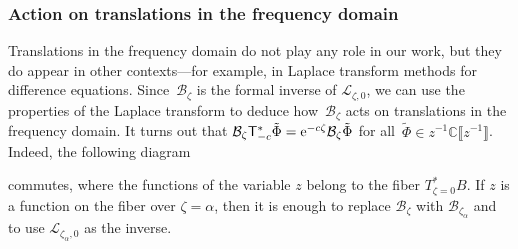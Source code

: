 \documentclass[10pt,a4paper]{amsart}
\newcommand{\C}{\mathbb{C}}
\newcommand{\series}[1]{\tilde{#1}}
\newcommand{\laplace}{\mathcal{L}}
\newcommand{\borel}{\mathcal{B}}
\numberwithin{equation}{section}
\begin{document}
\subsubsection{Action on translations in the frequency domain}
Translations in the frequency domain do not play any role in our work, but they do appear in other contexts---for example, in Laplace transform methods for difference equations. Since~$\borel_\zeta$ is the formal inverse of $\laplace_{\zeta,0}$, we can use the properties of the Laplace transform to deduce how~$\borel_\zeta$ acts on translations in the frequency domain. It turns out that
$\borel_\zeta \mathsf{T}_{-c}^* \series{\Phi} = {\rm e}^{-c\zeta }\borel_\zeta \series{\Phi}$
for all~${\series{\Phi} \in z^{-1} \C\big\llbracket z^{-1} \big\rrbracket}$.
Indeed, the following diagram
\begin{center}
\end{center}
commutes, where the functions of the variable $z$ belong to the fiber $T^*_{\zeta=0}B$. If $z$ is a function on the fiber over $\zeta=\alpha$, then it is enough to replace $\borel_\zeta$ with $\borel_{\zeta_\alpha}$ and to use $\laplace_{\zeta_\alpha,0}$ as the inverse.
%
\end{document}
